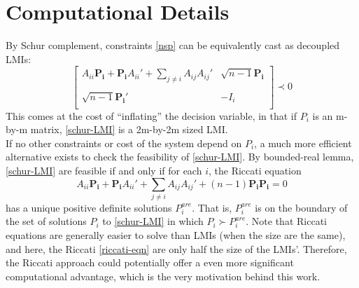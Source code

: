 \documentclass{article}
\begin{document}
\section{Computational Details} %
\label{sec:computational_consideration}

By Schur complement, constraints \eqref{nsp} can be equivalently cast as decoupled LMIs:
\begin{equation}\label{schur-LMI}
\begin{bmatrix}
   A_{ii}\pmb{P_{i}}+\pmb{P_{i}}A_{ii}'+\sum\limits_{j\neq i}A_{ij}A_{ij}'& \sqrt{n-1}\pmb{P_{i}}\\
   \\
\sqrt{n-1}\pmb{P_{i}}' &-I_i\\
\end{bmatrix}
\prec 0
\end{equation}
This comes at the cost of ``inflating'' the decision variable, in that if $P_i$ is an m-by-m matrix, \eqref{schur-LMI} is a 2m-by-2m sized LMI.\\

If no other constraints or cost of the system depend on $P_i$, a much more efficient alternative exists to check the feasibility of \eqref{schur-LMI}. By bounded-real lemma, \eqref{schur-LMI} are feasible if and only if for each $i$, the Riccati equation
\begin{equation}\label{riccati-eqn}
A_{ii}\pmb{P_i}+\pmb{P_i}A_{ii}'+\sum\limits_{j \neq i}\pmb{}A_{ij}A_{ij}'+(n-1)\pmb{P_i}\pmb{P_i}=0
\end{equation} has a unique positive definite solutions $P_{i}^{are}$. That is, $P_{i}^{are}$ is on the boundary of the set of solutions $P_i$ to \eqref{schur-LMI} in which $P_i\succ P_{i}^{are}$. Note that Riccati equations are generally easier to solve than LMIs (when the size are the same), and here, the Riccati \eqref{riccati-eqn} are only half the size of the LMIs'. Therefore, the Riccati approach could potentially offer a even more significant computational advantage, which is the very motivation behind this work.\\
\end{document}
